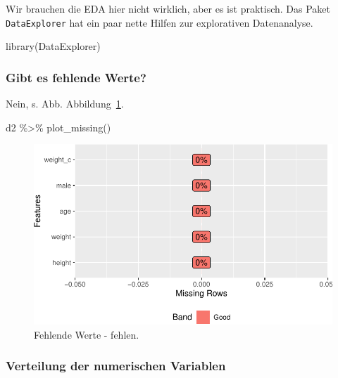 \documentclass[
  a4paper,
  DIV=11]{scrreprt}
\newenvironment{Shaded}{\begin{snugshade}}{\end{snugshade}}
\newcommand{\FunctionTok}[1]{\textcolor[rgb]{0.28,0.35,0.67}{#1}}
\newcommand{\NormalTok}[1]{\textcolor[rgb]{0.00,0.23,0.31}{#1}}
\newcommand{\SpecialCharTok}[1]{\textcolor[rgb]{0.37,0.37,0.37}{#1}}
\theoremstyle{definition}
\theoremstyle{remark}
\begin{document}
Wir brauchen die EDA hier nicht wirklich, aber es ist praktisch. Das
Paket \texttt{DataExplorer} hat ein paar nette Hilfen zur explorativen
Datenanalyse.

\begin{Shaded}
\begin{Highlighting}[]
\FunctionTok{library}\NormalTok{(DataExplorer)}
\end{Highlighting}
\end{Shaded}

\hypertarget{gibt-es-fehlende-werte}{%
\subsubsection{Gibt es fehlende Werte?}\label{gibt-es-fehlende-werte}}

Nein, s. Abb. Abbildung~\ref{fig-na}.

\begin{Shaded}
\begin{Highlighting}[]
\NormalTok{d2 }\SpecialCharTok{\%\textgreater{}\%} \FunctionTok{plot\_missing}\NormalTok{()}
\end{Highlighting}
\end{Shaded}

\begin{figure}[H]

{\centering \includegraphics{./lineare-modelle_files/figure-pdf/fig-na-1.pdf}

}

\caption{\label{fig-na}Fehlende Werte - fehlen.}

\end{figure}

\hypertarget{verteilung-der-numerischen-variablen}{%
\subsubsection{Verteilung der numerischen
Variablen}\label{verteilung-der-numerischen-variablen}}
\end{document}

